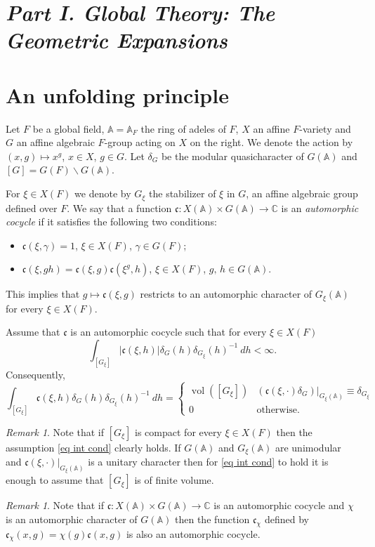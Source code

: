 \documentclass[12pt]{amsart}
\newcommand{\abs}[1]{\left|{#1}\right|}
\newcommand{\A}{\mathbb{A}}
\newcommand{\C}{\mathbb{C}}
\newcommand{\bs}{\backslash}
\newcommand{\vol}{\operatorname{vol}}
\renewcommand{\c}{\mathfrak{c}}
\theoremstyle{remark}
\newtheorem{remark}[theorem]{Remark}%
\begin{document}
\section*{\it{Part I. Global Theory: The Geometric Expansions}}\label{Global theory}
\section{An unfolding principle}\label{sec unfold}

Let $F$ be a global field, $\A=\A_F$ the ring of adeles of $F$,  
$X$ an affine $F$-variety and $G$ an affine algebraic $F$-group acting on $X$ on the right. 
We denote the action by $(x,g)\mapsto x^g$, $x\in X$, $g\in G$. Let $\delta_G$ be the modular quasicharacter of $G(\A)$ and $[G]=G(F)\bs G(\A)$. 

For $\xi\in X(F)$ we denote by $G_\xi$ the stabilizer of $\xi$ in $G$, an affine algebraic group defined over $F$.
We say that a function $\c:X(\A)\times G(\A)\rightarrow \C$ is an \emph{automorphic cocycle} if it satisfies the following two conditions:
\begin{itemize}
\item $\c(\xi,\gamma)=1$, $\xi\in X(F)$, $\gamma\in G(F)$;
\item $\c(\xi, gh)=\c(\xi,g)\c(\xi^g,h)$, $\xi\in X(F)$, $g,\,h\in G(\A)$. 
\end{itemize}
This implies that $g\mapsto \c(\xi,g)$ restricts to an automorphic character of $G_\xi(\A)$ for every $\xi\in X(F)$. 

Assume that $\c$ is an automorphic cocycle such that for every $\xi\in X(F)$ 
\begin{equation}\label{eq int cond}
\int_{[G_\xi]} \abs{\c(\xi,h)}\delta_G(h)\delta_{G_\xi}(h)^{-1}\ dh<\infty.
\end{equation}
Consequently,  
\begin{equation}\label{eq char int}
\int_{[G_\xi]} \c(\xi,h)\delta_G(h)\delta_{G_\xi}(h)^{-1}\ dh=\begin{cases} \vol([G_\xi]) & (\c(\xi,\cdot)\delta_G)|_{G_\xi(\A)}\equiv \delta_{G_\xi} \\ 0 & \text{otherwise.} \end{cases}
\end{equation}
\begin{remark}\label{rmk nec cond} Note that if $[G_\xi]$ is compact for every $\xi\in X(F)$ then the assumption \eqref{eq int cond} clearly holds. If $G(\A)$ and $G_\xi(\A)$ are unimodular and $\c(\xi,\cdot)|_{G_\xi(\A)}$ is a unitary character then for \eqref{eq int cond} to hold it is enough to assume that $[G_\xi]$ is of finite volume.
\end{remark}
\begin{remark}\label{rmk twist cocyc}
Note that if $\c:X(\A)\times G(\A)\rightarrow \C$ is an automorphic cocycle and $\chi$ is an automorphic character of $G(\A)$ then the function $\c_\chi$ defined by $\c_\chi(x,g)=\chi(g)\c(x,g)$ is also an automorphic cocycle. 
\end{remark}
\end{document}

